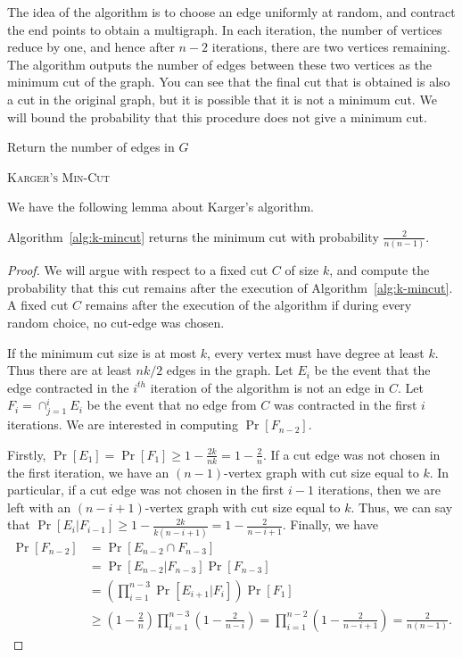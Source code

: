 The idea of the algorithm is to choose an edge uniformly at random, and contract the end points to obtain a multigraph. In each iteration, the number of vertices reduce by one, and hence after $n-2$ iterations, there are two vertices remaining. The algorithm outputs the number of edges between these two vertices as the minimum cut of the graph. You can see that the final cut that is obtained is also a cut in the original graph, but it is possible that it is not a minimum cut. We will bound the probability that this procedure does not give a minimum cut. 

\begin{algorithm}
	\BlankLine
	Return the number of edges in $G$
	\caption{\textsc{Karger's Min-Cut}}
	\label{alg:k-mincut}
\end{algorithm}
 
We have the following lemma about Karger's algorithm.

\begin{lemma}
	Algorithm~\ref{alg:k-mincut} returns the minimum cut with probability $\tfrac{2}{n(n-1)}$.
	\label{lem:karger-correctness}
\end{lemma}
\begin{proof}
	We will argue with respect to a fixed cut $C$ of size $k$, and compute the probability that this cut remains after the execution of Algorithm~\ref{alg:k-mincut}. A fixed cut $C$ remains after the execution of the algorithm if during every random choice, no cut-edge was chosen.
	
	If the minimum cut size is at most $k$, every vertex must have degree at least $k$. Thus there are at least $nk/2$ edges in the graph. Let $E_i$ be the event that the edge contracted in the $i^{th}$ iteration of the algorithm is not an edge in $C$. Let $F_i = \cap_{j=1}^i E_i$ be the event that no edge from $C$ was contracted in the first $i$ iterations. We are interested in computing $\Pr[F_{n-2}]$.
	
	Firstly, $\Pr[E_1] = \Pr[F_1] \geq 1 - \tfrac{2k}{nk}= 1 - \tfrac{2}{n}$. If a cut edge was not chosen in the first iteration, we have an $(n-1)$-vertex graph with cut size equal to $k$. In particular, if a cut edge was not chosen in the first $i-1$ iterations, then we are left with an $(n-i+1)$-vertex graph with cut size equal to $k$. Thus, we can say that $\Pr[E_i | F_{i-1}] \geq 1 - \tfrac{2k}{k(n-i+1)} = 1 - \tfrac{2}{n-i+1}$. Finally, we have
	\begin{align*}
		\Pr[F_{n-2}] &= \Pr[E_{n-2} \cap F_{n-3}] \\
		&= \Pr[E_{n-2}|F_{n-3}]\Pr[F_{n-3}]\\
		&= \left(\prod_{i=1}^{n-3} \Pr[E_{i+1}|F_i]\right) \Pr[F_1]\\
		&\geq \left(1 - \frac{2}{n} \right)\prod_{i=1}^{n-3} \left(1 - \frac{2}{n-i}\right) = \prod_{i=1}^{n-2} \left( 1 - \frac{2}{n-i+1} \right) = \frac{2}{n(n-1)}.
	\end{align*}
\end{proof}

